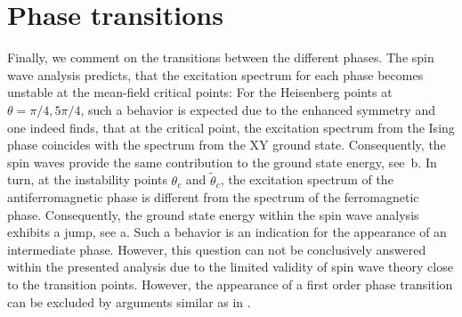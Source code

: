 \section{Phase transitions}
Finally, we comment on the transitions between the different phases. The spin wave analysis predicts,
that the excitation spectrum for each phase becomes unstable at the mean-field critical points: For the Heisenberg
points at $\theta = \pi/4, 5\pi/4$, such a behavior is expected due to the enhanced symmetry and one indeed finds,
that at the critical point, the excitation spectrum from the Ising phase coincides with the spectrum from the XY ground state.
Consequently, the spin waves provide the same contribution to the ground state energy, see~b. In turn, at the instability points
$\theta_{c}$ and $\tilde{\theta}_{c}$, the excitation spectrum of the antiferromagnetic phase is different from the spectrum of the ferromagnetic phase.
Consequently, the ground state energy within the spin wave analysis exhibits a jump, see a. Such a behavior is an indication
for the appearance of an intermediate phase. However, this question can not be conclusively answered within the presented analysis due to the limited validity of spin wave theory close to the transition points. However, the appearance of a first order phase transition can be excluded by arguments similar as in .
